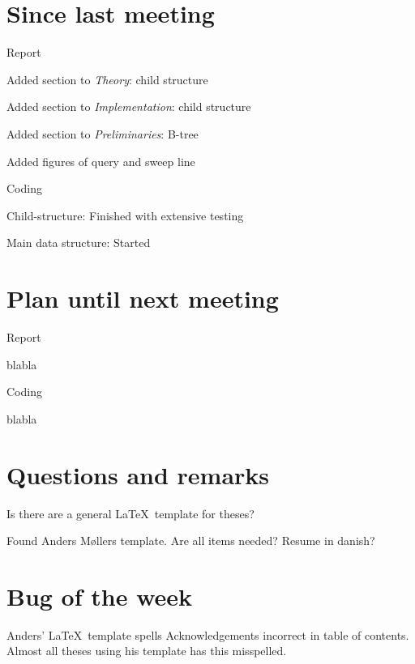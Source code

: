 \documentclass[a4paper,11pt,agenda,chair]{meetingmins}
\begin{document}
\maketitle

\section{Since last meeting}
\begin{items}
\item Report
	\begin{items}
		\item Added section to \textit{Theory}: child structure
		\item Added section to \textit{Implementation}: child structure
        \item Added section to \textit{Preliminaries}: B-tree
        \item Added figures of query and sweep line
	\end{items}
\item Coding
	\begin{items}
		\item Child-structure: Finished with extensive testing
		\item Main data structure: Started
	\end{items}
\end{items}

\section{Plan until next meeting}
\begin{items}
\item Report
	\begin{items}
		\item blabla
	\end{items}
\item Coding
	\begin{items}
		\item blabla
	\end{items}
\end{items}

\section{Questions and remarks}
\begin{items}
	\item Is there are a general \LaTeX~template for theses?
		\begin{items}
			\item Found Anders M\o llers template. Are all items needed? Resume in danish?
		\end{items}
\end{items}



\section{Bug of the week}
Anders' \LaTeX~template spells Acknowledgements incorrect in table of contents. Almost all theses using his template has this misspelled.
\end{document}
